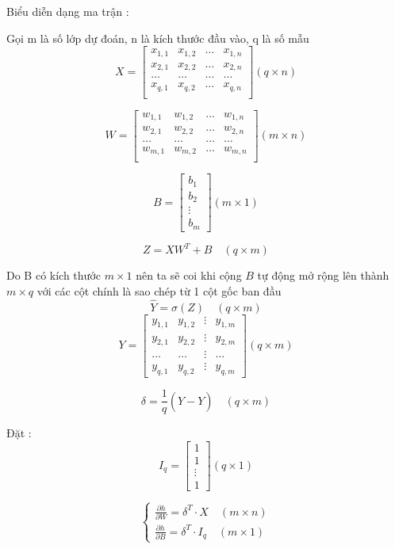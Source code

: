 \documentclass{article}
\begin{document}
\noindent Biểu diễn dạng ma trận :

\vspace{0.3cm}
\noindent Gọi m là số lớp dự đoán, n là kích thước đầu vào, q là số mẫu
\[
    X = \begin{bmatrix}
        x_{1, 1} & x_{1, 2} & \hdots & x_{1, n} \\
        x_{2, 1} & x_{2, 2} & \hdots & x_{2, n} \\
        \hdots & \hdots & \hdots & \hdots \\
        x_{q, 1} & x_{q, 2} & \hdots & x_{q, n} \\
    \end{bmatrix} (q \times n)
\]

\[
    W = \begin{bmatrix}
        w_{1, 1} & w_{1, 2} & \hdots & w_{1, n} \\
        w_{2, 1} & w_{2, 2} & \hdots & w_{2, n} \\
        \hdots & \hdots & \hdots & \hdots \\
        w_{m, 1} & w_{m, 2} & \hdots & w_{m, n} \\
    \end{bmatrix} (m \times n)
\]

\[
    B = \begin{bmatrix}
        b_1 \\ b_2 \\ \vdots \\ b_m
    \end{bmatrix} (m \times 1)
\]

\[
    Z = XW^T + B \quad (q \times m)
\]


\vspace{0.2cm}

\noindent Do B có kích thước $m \times 1$ nên ta sẽ coi khi cộng $B$ tự động mở rộng lên thành $m \times q$ với các cột chính là sao chép từ 1 cột gốc ban đầu
\[
    \hat{Y} = \sigma(Z) \quad (q \times m)
\]
\[
    Y = \begin{bmatrix}
        y_{1, 1} & y_{1, 2} & \vdots & y_{1, m} \\
        y_{2, 1} & y_{2, 2} & \vdots & y_{2, m} \\
        \hdots & \hdots & \vdots & \hdots \\
        y_{q, 1} & y_{q, 2} & \vdots & y_{q, m}
    \end{bmatrix} (q \times m)
\]

\[
    \delta = \frac{1}{q}(\hat{Y} - Y) \quad (q \times m)
\]

\noindent Đặt :
\[
I_q = \begin{bmatrix}
    1 \\ 1 \\ \vdots \\ 1    
\end{bmatrix} (q \times 1)
\]

\[
    \begin{cases}
        \frac{\partial h}{\partial W} = \delta^T \cdot X \quad (m \times n) \\
        \frac{\partial h}{\partial B} = \delta^T \cdot I_q \quad (m \times 1)
    \end{cases}
\]
\end{document}
